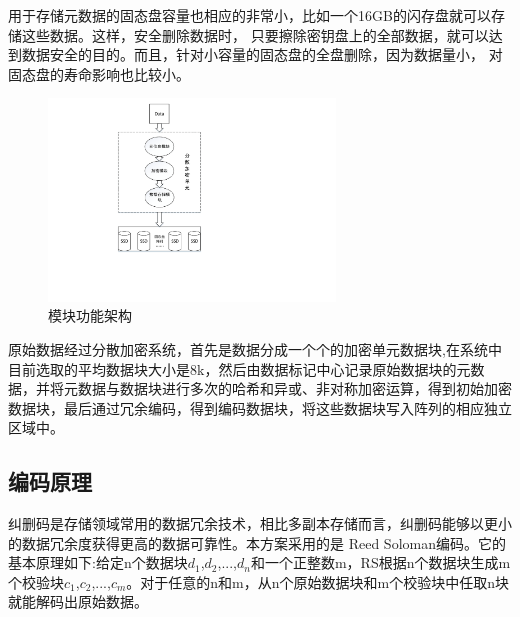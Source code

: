 用于存储元数据的固态盘容量也相应的非常小，比如一个16GB的闪存盘就可以存储这些数据。这样，安全删除数据时，
只要擦除密钥盘上的全部数据，就可以达到数据安全的目的。而且，针对小容量的固态盘的全盘删除，因为数据量小，
对固态盘的寿命影响也比较小。
\begin{figure}[H]
	\centering
	\includegraphics[width=3in]{Pics/total-structure.pdf}
    \caption{模块功能架构}
    \label{fig:4}
\end{figure}
原始数据经过分散加密系统，首先是数据分成一个个的加密单元数据块,在系统中目前选取的平均数据块大小是8k，然后由数据标记中心记录原始数据块的元数据，并将元数据与数据块进行多次的哈希和异或、非对称加密运算，得到初始加密数据块，最后通过冗余编码，得到编码数据块，将这些数据块写入阵列的相应独立区域中。
\subsection{编码原理}
纠删码是存储领域常用的数据冗余技术，相比多副本存储而言，纠删码能够以更小的数据冗余度获得更高的数据可靠性。本方案采用的是
Reed Soloman编码\cite{Plank1996A,Plank2013Erasure}。它的基本原理如下:给定n个数据块$d_1$,$d_2$,...,$d_n$和一个正整数m，RS根据n个数据块生成m个校验块$c_1$,$c_2$,...,$c_m$。对于任意的n和m，从n个原始数据块和m个校验块中任取n块就能解码出原始数据。


